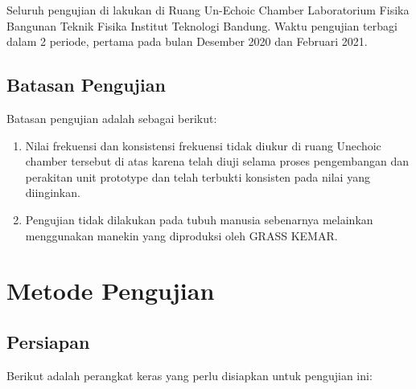 \documentclass[12pt,]{article}
\begin{document}
	Seluruh pengujian di lakukan di Ruang Un-Echoic Chamber Laboratorium Fisika Bangunan Teknik Fisika 
	Institut Teknologi Bandung. Waktu pengujian terbagi dalam 2 periode, pertama pada bulan Desember 2020 dan Februari 2021.
	
	\subsection{Batasan Pengujian}
	
	Batasan pengujian adalah sebagai berikut:
	
	\begin{enumerate}
		\item Nilai frekuensi dan konsistensi frekuensi tidak diukur di ruang Unechoic chamber tersebut di atas 
		karena telah diuji selama proses pengembangan dan perakitan unit prototype dan telah terbukti konsisten pada nilai yang diinginkan.
		
		\item Pengujian tidak dilakukan pada tubuh manusia sebenarnya melainkan menggunakan manekin yang diproduksi oleh GRASS KEMAR.
	\end{enumerate}


	\newpage
	\section{Metode Pengujian}
	
	\subsection{Persiapan}
	
	Berikut adalah perangkat keras yang perlu disiapkan untuk pengujian ini:
\end{document}
